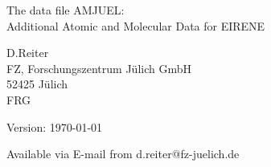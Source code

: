 \documentclass[12pt]{article}
\begin{document}
\parindent 0pt
{\LARGE \bf \center
\vspace*{3truecm}

The data file AMJUEL: \\
Additional Atomic and Molecular Data for EIRENE
\vspace*{3truecm}

D.Reiter \\
FZ, Forschungszentrum J\"ulich GmbH \\
52425 J\"ulich \\
FRG
\vspace{5truecm}

Version: \today
\vspace{3truecm}

Available via E-mail from d.reiter@fz-juelich.de
}
\tableofcontents
\newpage
\end{document}
